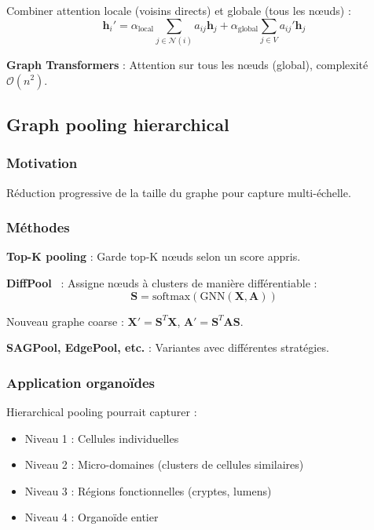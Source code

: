 Combiner attention locale (voisins directs) et globale (tous les nœuds) :
\[
\mathbf{h}_i' = \alpha_{\text{local}} \sum_{j \in \mathcal{N}(i)} a_{ij} \mathbf{h}_j + \alpha_{\text{global}} \sum_{j \in V} a_{ij}' \mathbf{h}_j
\]

\textbf{Graph Transformers} : Attention sur tous les nœuds (global), complexité $\mathcal{O}(n^2)$.

\subsection{Graph pooling hierarchical}

\subsubsection{Motivation}

Réduction progressive de la taille du graphe pour capture multi-échelle.

\subsubsection{Méthodes}

\textbf{Top-K pooling} : Garde top-K nœuds selon un score appris.

\textbf{DiffPool}~\cite{Ying2018} : Assigne nœuds à clusters de manière différentiable :
\[
\mathbf{S} = \text{softmax}(\text{GNN}(\mathbf{X}, \mathbf{A}))
\]

Nouveau graphe coarse : $\mathbf{X}' = \mathbf{S}^T \mathbf{X}$, $\mathbf{A}' = \mathbf{S}^T \mathbf{A} \mathbf{S}$.

\textbf{SAGPool, EdgePool, etc.} : Variantes avec différentes stratégies.

\subsubsection{Application organoïdes}

Hierarchical pooling pourrait capturer :
\begin{itemize}
    \item Niveau 1 : Cellules individuelles
    \item Niveau 2 : Micro-domaines (clusters de cellules similaires)
    \item Niveau 3 : Régions fonctionnelles (cryptes, lumens)
    \item Niveau 4 : Organoïde entier
\end{itemize}

